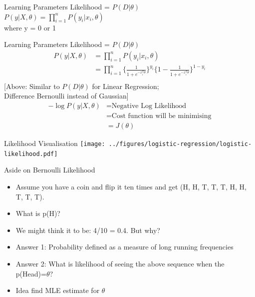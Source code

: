 \documentclass{beamer}
\begin{document}
\begin{frame}{Learning Parameters}
Likelihood = $P(D | \theta)$ \\
\vspace{0.2cm}
$P(y | X, \theta) = \prod_{i=1}^{n} P(y_{i} | x_{i}, \theta)$ \\ where y = 0 or 1
\end{frame}
\begin{frame}{Learning Parameters}
Likelihood = $P(D | \theta)$ \\
\vspace{-0.4cm}
\begin{align*}
P(y | X, \theta) &= \prod_{i=1}^{n} P(y_{i} | x_{i}, \theta) \\ &= \prod_{i=1}^{n} \Big\{\frac{1}{1 + e^{-x_{i}^{T}\theta}}\Big\}^{y_{i}}\Big\{1 - \frac{1}{1 + e^{-x_{i}^{T}\theta}}\Big\}^{1 - y_{i}} \\
\end{align*}
\vspace{0.2cm}
[Above: Similar to $P(D|\theta)$ for Linear Regression; \\
\hspace{1.3cm} Difference Bernoulli instead of Gaussian]\\
\begin{align*}
-\log P(y | X, \theta) &= \text{Negative Log Likelihood}\\ &= \text{Cost function will be minimising} \\ &= J(\theta)
\end{align*}
\end{frame}


\begin{frame}{Likelihood Visualisation}
\texttt{[image: ../figures/logistic-regression/logistic-likelihood.pdf]}
\end{frame}

\begin{frame}{Aside on Bernoulli Likelihood}
\begin{itemize}[<+->]
\item Assume you have a coin and flip it ten times and get (H, H, T, T, T, H, H, T, T, T).
\item What is p(H)?
\item We might think it to be: 4/10 = 0.4. But why?
\item Answer 1: Probability defined as a measure of long running frequencies
\item Answer 2: What is likelihood of seeing the above sequence when the p(Head)=$\theta$?
\item Idea find MLE estimate for $\theta$
\end{itemize}

\end{frame}
\end{document}
